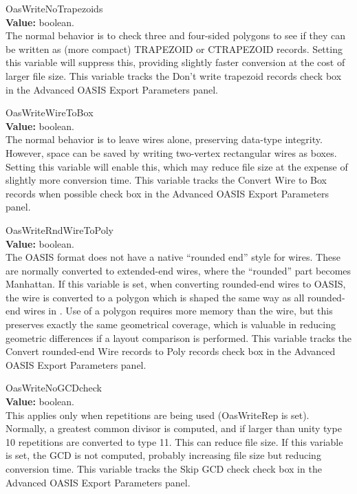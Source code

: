 \begin{description}
\item{\et OasWriteNoTrapezoids}\\
{\bf Value:} boolean.\\
The normal behavior is to check three and four-sided polygons to see
if they can be written as (more compact) TRAPEZOID or CTRAPEZOID
records.  Setting this variable will suppress this, providing slightly
faster conversion at the cost of larger file size.  This variable
tracks the {\cb Don't write trapezoid records} check box in the {\cb
Advanced OASIS Export Parameters} panel.

\item{\et OasWriteWireToBox}\\
{\bf Value:} boolean.\\
The normal behavior is to leave wires alone, preserving data-type
integrity.  However, space can be saved by writing two-vertex
rectangular wires as boxes.  Setting this variable will enable this,
which may reduce file size at the expense of slightly more conversion
time.  This variable tracks the {\cb Convert Wire to Box records when
possible} check box in the {\cb Advanced OASIS Export Parameters}
panel.

\item{\et OasWriteRndWireToPoly}\\
{\bf Value:} boolean.\\
The OASIS format does not have a native ``rounded end'' style for
wires.  These are normally converted to extended-end wires, where the
``rounded'' part becomes Manhattan.  If this variable is set, when
converting rounded-end wires to OASIS, the wire is converted to a
polygon which is shaped the same way as all rounded-end wires in
{\Xic}.  Use of a polygon requires more memory than the wire, but this
preserves exactly the same geometrical coverage, which is valuable in
reducing geometric differences if a layout comparison is performed. 
This variable tracks the {\cb Convert rounded-end Wire records to Poly
records} check box in the {\cb Advanced OASIS Export Parameters}
panel.

\item{\et OasWriteNoGCDcheck}\\
{\bf Value:} boolean.\\
This applies only when repetitions are being used ({\et OasWriteRep}
is set).  Normally, a greatest common divisor is computed, and if
larger than unity type 10 repetitions are converted to type 11.  This
can reduce file size.  If this variable is set, the GCD is not
computed, probably increasing file size but reducing conversion time. 
This variable tracks the {\cb Skip GCD check} check box in the {\cb
Advanced OASIS Export Parameters} panel.


\end{description}
